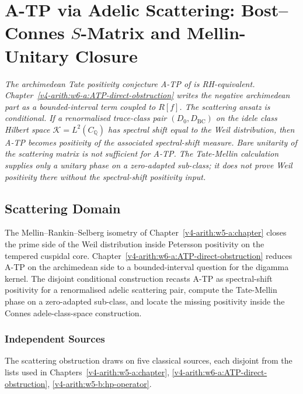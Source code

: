 \chapter{A-TP via Adelic Scattering: Bost--Connes \(S\)-Matrix and Mellin-Unitary Closure}
\label{v4-arith:w7-j:ATP-adelic-scattering}

\emph{The archimedean Tate positivity conjecture
A-TP of  is
RH-equivalent. Chapter~\ref{v4-arith:w6-a:ATP-direct-obstruction}
writes the negative archimedean part as a bounded-interval term
coupled to \(R[f]\). The scattering ansatz is conditional. If a
renormalised trace-class pair
\((D_{0},D_{\mathrm{BC}})\) on the idele class Hilbert space
\(\mathcal{K}=L^{2}(C_{\mathbb{Q}})\) has spectral shift equal to the
Weil distribution, then A-TP becomes positivity of the associated
spectral-shift measure. Bare unitarity of the scattering matrix is
not sufficient for A-TP. The Tate-Mellin calculation supplies only a
unitary phase on a zero-adapted sub-class; it does not prove Weil
positivity there without the spectral-shift positivity input.}

\section{Scattering Domain}
\label{v4-arith:w7-j:domain}

The Mellin--Rankin--Selberg isometry of
Chapter~\ref{v4-arith:w5-a:chapter} closes the prime side of the Weil
distribution inside Petersson positivity on the tempered cuspidal
core. Chapter~\ref{v4-arith:w6-a:ATP-direct-obstruction} reduces A-TP on
the archimedean side to a bounded-interval question for the digamma
kernel. The disjoint conditional construction recasts A-TP as
spectral-shift positivity for a renormalised adelic
scattering pair, compute the Tate-Mellin phase on a zero-adapted
sub-class, and locate the missing positivity inside the Connes
adele-class-space construction.

\subsection{Independent Sources}
\label{v4-arith:w7-j:sources}

The scattering obstruction draws on five classical sources, each disjoint
from the lists used in
Chapters~\ref{v4-arith:w5-a:chapter},
\ref{v4-arith:w6-a:ATP-direct-obstruction},
\ref{v4-arith:w5-b:hp-operator}.

